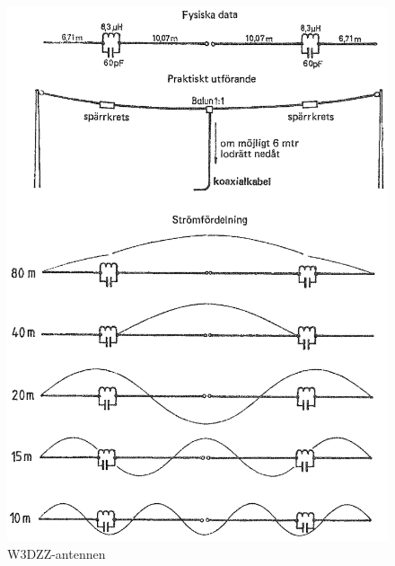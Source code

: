 \begin{figure}
  \includegraphics[width=\textwidth]{images/cropped_pdfs/bild_2_6-16.pdf}
  \caption{W3DZZ-antennen}
  \label{fig:bildII6-16}
\end{figure}

